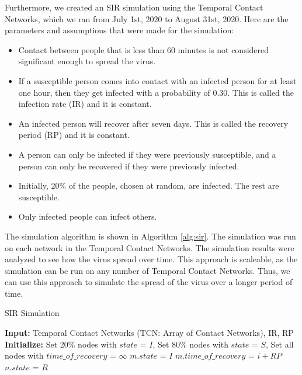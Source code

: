 \documentclass[times, 10pt,twocolumn]{article}
\begin{document}
Furthermore, we created an SIR simulation using the Temporal Contact Networks, which we ran from July 1st, 2020 to August 31st, 2020. Here are the parameters and assumptions that were made for the simulation:
\begin{itemize}[itemsep=0pt]
    \item Contact between people that is less than 60 minutes is not considered significant enough to spread the virus.
    \item If a susceptible person comes into contact with an infected person for at least one hour, then they get infected with a probability of 0.30. This is called the infection rate (IR) and it is constant.
    \item An infected person will recover after seven days. This is called the recovery period (RP) and it is constant.
    \item A person can only be infected if they were previously susceptible, and a person can only be recovered if they were previously infected.
    \item Initially, 20\% of the people, chosen at random, are infected. The rest are susceptible.
    \item Only infected people can infect others.
\end{itemize}

The simulation algorithm is shown in Algorithm \ref{alg:sir}. The simulation was run on each network in the Temporal Contact Networks. The simulation results were analyzed to see how the virus spread over time. This approach is scaleable, as the simulation can be run on any number of Temporal Contact Networks. Thus, we can use this approach to simulate the spread of the virus over a longer period of time.

\begin{algorithm}
\caption{SIR Simulation}
\label{alg:sir}
\begin{minipage}{\linewidth}
\scriptsize
\begin{algorithmic}
    \STATE \textbf{Input:} Temporal Contact Networks (TCN: Array of Contact Networks), IR, RP
    \STATE \textbf{Initialize:} Set 20\% nodes with $state$ = $I$, Set 80\% nodes with $state$ = $S$, Set all nodes with $time\_of\_recovery$ = $\infty$
                \STATE $m.state$ = $I$
                \STATE $m.time\_of\_recovery$ = $i + RP$
            \ENDIF
        \ENDFOR
            \STATE $n.state$ = $R$
        \ENDIF
    \ENDFOR
\ENDFOR
\end{algorithmic}
\end{minipage}
\end{algorithm}
\end{document}
